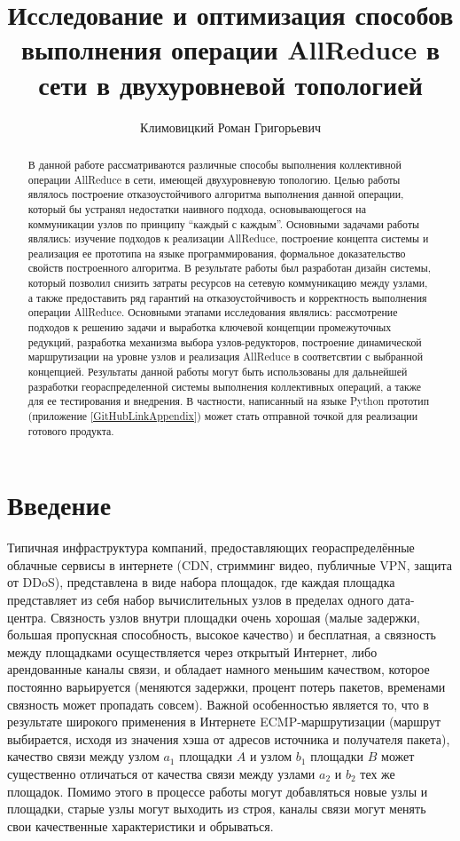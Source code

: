 \documentclass{article}
\title{Исследование и оптимизация способов выполнения операции AllReduce в сети в двухуровневой топологией}
\author{Климовицкий Роман Григорьевич}
\theoremstyle{plain}
\theoremstyle{plain}
\theoremstyle{plain}
\theoremstyle{plain}
\theoremstyle{definition}
\theoremstyle{remark}
\theoremstyle{plain}
\begin{document}
\titlepage
\clearpage
\setcounter{page}{2}

\large

\begin{abstract}
\large
    В данной работе рассматриваются различные способы выполнения коллективной операции All\-Re\-duce в сети, имеющей двухуровневую топологию. Целью работы являлось построение отказоустойчивого алгоритма выполнения данной операции, который бы устранял недостатки наивного подхода, основывающегося на коммуникации узлов по принципу \enquote{каждый с каждым}. Основными задачами работы являлись: изучение подходов к реализации AllReduce, построение концепта системы и реализация ее прототипа на языке программирования, формальное доказательство свойств построенного алгоритма. В результате работы был разработан дизайн системы, который позволил снизить затраты ресурсов на сетевую коммуникацию между узлами, а также предоставить ряд гарантий на отказоустойчивость и корректность выполнения операции AllReduce. Основными этапами исследования являлись: рассмотрение подходов к решению задачи и выработка ключевой концепции промежуточных редукций, разработка механизма выбора узлов-редукторов, построение динамической маршрутизации на уровне узлов и реализация AllReduce в соответсвтии с выбранной концепцией. Результаты данной работы могут быть использованы для дальнейшей разработки геораспределенной системы выполнения коллективных операций, а также для ее тестирования и внедрения. В частности, написанный на языке Python прототип (приложение \ref{GitHubLinkAppendix}) может стать отправной точкой для реализации готового продукта.
\end{abstract}
\clearpage

\tableofcontents
\clearpage

\section{Введение}

Типичная инфраструктура компаний, предоставляющих геораспределённые облачные сервисы в интернете (CDN, стримминг видео, публичные VPN, защита от DDoS), представлена в виде набора площадок, где каждая площадка представляет из себя набор вычислительных узлов в пределах одного дата-центра. Связность узлов внутри площадки очень хорошая (малые задержки, большая пропускная способность, высокое качество) и бесплатная, а связность между площадками осуществляется через открытый Интернет, либо арендованные каналы связи, и обладает намного меньшим качеством, которое постоянно варьируется (меняются задержки, процент потерь пакетов, временами связность может пропадать совсем). Важной особенностью является то, что в результате широкого применения в Интернете ECMP-маршрутизации (маршрут выбирается, исходя из значения хэша от адресов источника и получателя пакета), качество связи между узлом $a_1$ площадки $A$ и узлом $b_1$ площадки $B$ может существенно отличаться от качества связи между узлами $a_2$ и $b_2$ тех же площадок. Помимо этого в процессе работы могут добавляться новые узлы и площадки, старые узлы могут выходить из строя, каналы связи могут менять свои качественные характеристики и обрываться.
\end{document}
